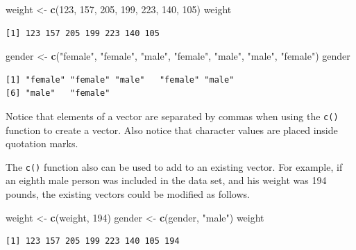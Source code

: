 \documentclass[
]{krantz}
\makeatletter
\newenvironment{Shaded}{\begin{snugshade}}{\end{snugshade}}
\newcommand{\DecValTok}[1]{\textcolor[rgb]{0.06,0.06,0.06}{#1}}
\newcommand{\KeywordTok}[1]{\textcolor[rgb]{0.27,0.27,0.27}{\textbf{#1}}}
\newcommand{\NormalTok}[1]{#1}
\newcommand{\StringTok}[1]{\textcolor[rgb]{0.5,0.5,0.5}{#1}}
\newenvironment{kframe}{%
\medskip{}
\setlength{\fboxsep}{.8em}
 \def\at@end@of@kframe{}%
 \ifinner\ifhmode%
  \def\at@end@of@kframe{\end{minipage}}%
  \begin{minipage}{\columnwidth}%
 \fi\fi%
 \def\FrameCommand##1{\hskip\@totalleftmargin \hskip-\fboxsep
 \colorbox{shadecolor}{##1}\hskip-\fboxsep
     \hskip-\linewidth \hskip-\@totalleftmargin \hskip\columnwidth}%
 \MakeFramed {\advance\hsize-\width
   \@totalleftmargin\z@ \linewidth\hsize
   \@setminipage}}%
 {\par\unskip\endMakeFramed%
 \at@end@of@kframe}
\renewenvironment{Shaded}{\begin{kframe}}{\end{kframe}}
\makeatother
\begin{document}
\begin{Shaded}
\begin{Highlighting}[]
\NormalTok{weight \textless{}{-}}\StringTok{ }\KeywordTok{c}\NormalTok{(}\DecValTok{123}\NormalTok{, }\DecValTok{157}\NormalTok{, }\DecValTok{205}\NormalTok{, }\DecValTok{199}\NormalTok{, }\DecValTok{223}\NormalTok{, }\DecValTok{140}\NormalTok{, }\DecValTok{105}\NormalTok{)}
\NormalTok{weight}
\end{Highlighting}
\end{Shaded}

\begin{verbatim}
[1] 123 157 205 199 223 140 105
\end{verbatim}

\begin{Shaded}
\begin{Highlighting}[]
\NormalTok{gender \textless{}{-}}\StringTok{ }\KeywordTok{c}\NormalTok{(}\StringTok{"female"}\NormalTok{, }\StringTok{"female"}\NormalTok{, }\StringTok{"male"}\NormalTok{, }\StringTok{"female"}\NormalTok{, }\StringTok{"male"}\NormalTok{,}
            \StringTok{"male"}\NormalTok{, }\StringTok{"female"}\NormalTok{)}
\NormalTok{gender}
\end{Highlighting}
\end{Shaded}

\begin{verbatim}
[1] "female" "female" "male"   "female" "male"  
[6] "male"   "female"
\end{verbatim}

Notice that elements of a vector are separated by commas when using the \texttt{c()} function to create a vector. Also notice that character values are placed inside quotation marks.

The \texttt{c()} function also can be used to add to an existing vector. For example, if an eighth male person was included in the data set, and his weight was 194 pounds, the existing vectors could be modified as follows.

\begin{Shaded}
\begin{Highlighting}[]
\NormalTok{weight \textless{}{-}}\StringTok{ }\KeywordTok{c}\NormalTok{(weight, }\DecValTok{194}\NormalTok{)}
\NormalTok{gender \textless{}{-}}\StringTok{ }\KeywordTok{c}\NormalTok{(gender, }\StringTok{"male"}\NormalTok{)}
\NormalTok{weight}
\end{Highlighting}
\end{Shaded}

\begin{verbatim}
[1] 123 157 205 199 223 140 105 194
\end{verbatim}
\end{document}
